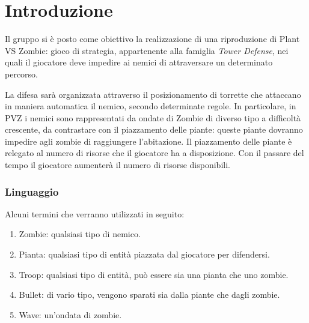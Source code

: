 \section*{Introduzione}
Il gruppo si è posto come obiettivo la realizzazione di una riproduzione di Plant VS Zombie:
gioco di strategia, appartenente alla famiglia \textit{Tower Defense}, nei quali il giocatore
deve impedire ai nemici di attraversare un determinato percorso.

La difesa sarà organizzata attraverso il
posizionamento di torrette che attaccano in maniera automatica il nemico, secondo determinate regole.
In particolare, in PVZ i nemici sono rappresentati da ondate di Zombie di diverso tipo a difficoltà crescente,
da contrastare con il piazzamento delle piante: queste piante dovranno impedire agli zombie di raggiungere l'abitazione.
Il piazzamento delle piante è relegato al numero di risorse che il giocatore ha a disposizione.
Con il passare del tempo il giocatore aumenterà il numero di risorse disponibili.

\subsubsection{Linguaggio}
Alcuni termini che verranno utilizzati in seguito:
\begin{enumerate}
    \item Zombie: qualsiasi tipo di nemico.
    \item Pianta: qualsiasi tipo di entità piazzata dal giocatore per difendersi.
    \item Troop: qualsiasi tipo di entità, può essere sia una pianta che uno zombie.
    \item Bullet: di vario tipo, vengono sparati sia dalla piante che dagli zombie.
    \item Wave: un'ondata di zombie.
\end{enumerate}
